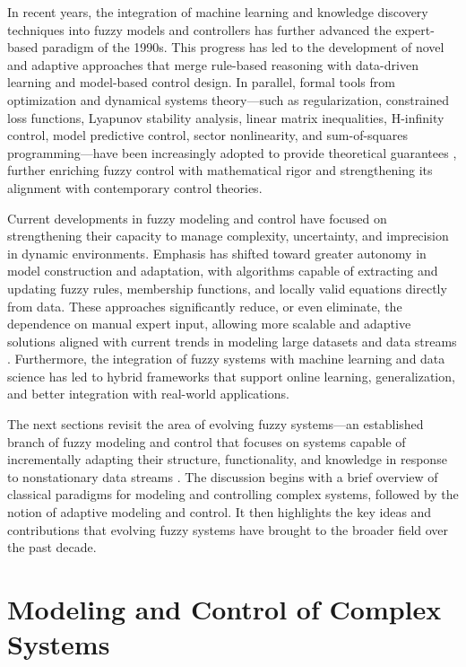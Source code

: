 \documentclass[conference]{IEEEtran}
\begin{document}
In recent years, the integration of machine learning and knowledge discovery techniques into fuzzy models and controllers has further advanced the expert-based paradigm of the 1990s. This progress has led to the development of novel and adaptive approaches that merge rule-based reasoning with data-driven learning and model-based control design. In parallel, formal tools from optimization and dynamical systems theory—such as regularization, constrained loss functions, Lyapunov stability analysis, linear matrix inequalities, H-infinity control, model predictive control, sector nonlinearity, and sum-of-squares programming—have been increasingly adopted to provide theoretical guarantees \cite{Tanaka2004, Leite2015, Skrjanc2019}, further enriching fuzzy control with mathematical rigor and strengthening its alignment with contemporary control theories.

Current developments in fuzzy modeling and control have focused on strengthening their capacity to manage complexity, uncertainty, and imprecision in dynamic environments. Emphasis has shifted toward greater autonomy in model construction and adaptation, with algorithms capable of extracting and updating fuzzy rules, membership functions, and locally valid equations directly from data. These approaches significantly reduce, or even eliminate, the dependence on manual expert input, allowing more scalable and adaptive solutions aligned with current trends in modeling large datasets and data streams \cite{Skrjanc2019}. Furthermore, the integration of fuzzy systems with machine learning and data science has led to hybrid frameworks that support online learning, generalization, and better integration with real-world applications.

The next sections revisit the area of evolving fuzzy systems—an established branch of fuzzy modeling and control that focuses on systems capable of incrementally adapting their structure, functionality, and knowledge in response to nonstationary data streams \cite{Skrjanc2019, kasabov2002, plamen2002, plamen2004, Sayed2012}. The discussion begins with a brief overview of classical paradigms for modeling and controlling complex systems, followed by the notion of adaptive modeling and control. It then highlights the key ideas and contributions that evolving fuzzy systems have brought to the broader field over the past decade.

\section{Modeling and Control of Complex Systems}
\end{document}
